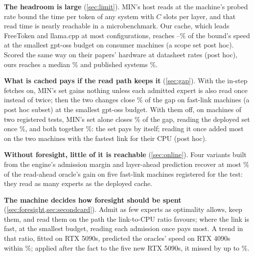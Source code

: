 \begin{table}[!t]
\begin{tabular}
\bottomrule
\end{tabular}
\end{table}


\textbf{The headroom is large} (\cref{sec:limit}). MIN's host reads at the machine's probed rate bound the time per
token of any system with $C$ slots per layer, and that read time is nearly reachable in a microbenchmark. Our cache,
which leads FreeToken and llama.cpp at most configurations, reaches \dcShareMinLowMin--\dcShareMinLowMax\% of the
bound's speed at the smallest gpt-oss budget on consumer machines (a scope set post hoc). Scored the same way on their papers' hardware at datasheet rates (post hoc),
ours reaches a median \audOursMed\% and published systems \audInclassMed\%.

\textbf{What is cached pays if the read path keeps it} (\cref{sec:gap}). With the in-step fetches on, MIN's set
gains nothing unless each admitted expert is also read once instead of twice; then the two changes close
\dmTogetherLow\% of the gap on fast-link machines (a post hoc subset) at the smallest gpt-oss budget. With them off, on \dpNWord{} machines of two registered tests,
MIN's set alone closes \dmCpuSetaloneZeroLow\% of the gap, reading the deployed set once \dmCpuOncealoneZeroLow\%, and
both together \dmCpuTogetherZeroLow\%: the set pays by itself; reading it once added most on the two machines with the fastest link for their CPU
(post hoc).

\textbf{Without foresight, little of it is reachable} (\cref{sec:online}). Four variants built from the engine's
admission margin and layer-ahead prediction recover at most \olCapLowMax\% of the read-ahead oracle's gain on five
fast-link machines registered for the test: they read as many experts as the deployed cache.

\textbf{The machine decides how foresight should be spent} (\cref{sec:foresight,sec:secondcard}). Admit as few
experts as optimality allows, keep them, and read them on the path the link-to-CPU ratio favours; where the link is
fast, at the smallest budget, reading each admission once pays most. A trend in that ratio, fitted on RTX 5090s,
predicted the oracles' speed on \cxAllNWord{} RTX 4090s within \cxAllDevLowMax\%; applied after the fact to the five new
RTX 5090s, it missed by up to \olTrendDevMax\%.

